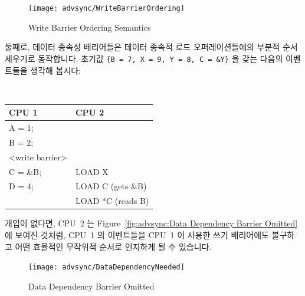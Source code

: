 \begin{enumerate}
\begin{figure}[htb]
\begin{center}
\texttt{[image: advsync/WriteBarrierOrdering]}
\end{center}
\caption{Write Barrier Ordering Semantics}
\end{figure}

둘째로, 데이터 종속성 배리어들은 데이터 종속적 로드 오퍼레이션들에의 부분적
순서세우기로 동작합니다.
초기값 {\tt \{B = 7, X = 9, Y = 8, C = \&Y\}} 을 갖는 다음의 이벤트들을 생각해
봅시다:

\vspace{5pt}
\begin{minipage}[t]{\columnwidth}
\tt
\scriptsize
\begin{tabular}{l|p{1.5in}}
	CPU 1 &		CPU 2 \\
	\hline
	A = 1; & \\
	B = 2; & \\
	<write barrier> & \\
	C = \&B; & 	LOAD X\\
	D = 4;	&	LOAD C (gets \&B) \\
		&	LOAD *C (reads B) \\
\end{tabular}
\end{minipage}
\vspace{5pt}

개입이 없다면, CPU~2 는
Figure~\ref{fig:advsync:Data Dependency Barrier Omitted} 에 보여진 것처럼,
CPU~1 의 이벤트들을 CPU~1 이 사용한 쓰기 배리어에도 불구하고 어떤 효율적인
무작위적 순서로 인지하게 될 수 있습니다.

\begin{figure}[htb]
\begin{center}
\texttt{[image: advsync/DataDependencyNeeded]}
\end{center}
\caption{Data Dependency Barrier Omitted}
\end{figure}


\end{enumerate}

